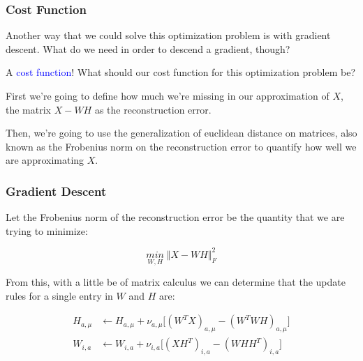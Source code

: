 \documentclass{beamer}
\begin{document}
\begin{frame}
  \frametitle{Cost Function}
  Another way that we could solve this optimization problem is with gradient descent. What do we need in order to descend a gradient, though? \vspace{4mm} \pause

  A \textcolor{blue}{cost function}! What should our cost function for this optimization problem be? \vspace{4mm} \pause

  First we're going to define how much we're missing in our approximation of $X$, the matrix $X - WH$ as the reconstruction error. \vspace{4mm} \pause

  Then, we're going to use the generalization of euclidean distance on matrices, also known as the Frobenius norm on the reconstruction error to quantify how well we are approximating $X$.
\end{frame}

\begin{frame}
  \frametitle{Gradient Descent}
  Let the Frobenius norm of the reconstruction error be the quantity that we are trying to minimize:

  $$ \underset{W, H}{min} \; \big\Vert X - W H \big\Vert^2_{F} $$ \vspace{0.5mm}

  From this, with a little be of matrix calculus we can determine that the update rules for a single entry in $W$ and $H$ are: \vspace{-1mm}

  \begin{align*}
    H_{a, \mu} &\leftarrow H_{a, \mu} + \nu_{a, \mu}\big[(W^T X)_{a, \mu} - (W^T WH)_{a, \mu}\big] \\
    W_{i, a} &\leftarrow W_{i, a} + \nu_{i, a}\big[(XH^T)_{i, a} - (WHH^T)_{i, a}\big]
  \end{align*}
\end{frame}
\end{document}
